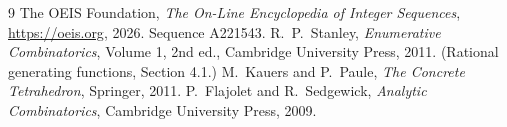 \documentclass[11pt,a4paper]{article}
\theoremstyle{plain}
\theoremstyle{definition}
\begin{document}
\begin{thebibliography}{9}
 The OEIS Foundation, \emph{The On-Line Encyclopedia of Integer
Sequences}, \url{https://oeis.org}, 2026. Sequence A221543.
 R.~P.~Stanley, \emph{Enumerative Combinatorics}, Volume 1, 2nd ed.,
Cambridge University Press, 2011. (Rational generating functions, Section 4.1.)
 M.~Kauers and P.~Paule, \emph{The Concrete Tetrahedron}, Springer, 2011.
 P.~Flajolet and R.~Sedgewick, \emph{Analytic Combinatorics}, Cambridge
University Press, 2009.
\end{thebibliography}
\end{document}
